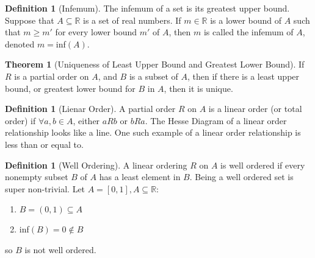 \documentclass[10pt]{article}
\theoremstyle{definition}
\newtheorem{definition}[equation]{Definition}
\newtheorem{theorem}[equation]{Theorem}
\newcommand{\R}{\mathbb{R}}
\begin{document}
\begin{definition}[Infemum]
  The infemum of a set is its greatest upper bound. Suppose that $A\subseteq\R$ is a set of real numbers. If $m\in\R$ is a lower bound of $A$ such that $m\geq m′$ for every lower bound $m′$ of $A$, then $m$ is called the infemum of $A$, denoted $m = $inf$(A)$.
\end{definition}

\begin{theorem}[Uniqueness of Least Upper Bound and Greatest Lower Bound]
  If $R$ is a partial order on $A$, and $B$ is a subset of $A$, then if there is a least upper bound, or greatest lower bound for $B$ in $A$, then it is unique.
\end{theorem}

\begin{definition}[Lienar Order]
  A partial order $R$ on $A$ is a linear order (or total order) if $\forall a,b\in A$, either $aRb$ or $bRa$. The Hesse Diagram of a linear order relationship looks like a line. One such example of a linear order relationship is less than or equal to.
\end{definition}

\begin{definition}[Well Ordering]
  A linear ordering $R$ on $A$ is well ordered if every nonempty subset $B$ of $A$ has a least element in $B$. Being a well ordered set is super non-trivial.
  Let $A=[0,1], A\subseteq\R$:
  \begin{enumerate}
    \item $B=(0,1)\subseteq A$
    \item inf$(B) = 0 \not\in B$
  \end{enumerate}
  so $B$ is not well ordered.
\end{definition}
\end{document}
